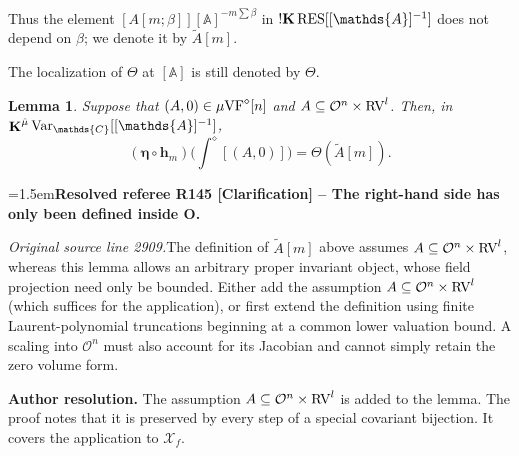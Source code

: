 \documentclass[12pt]{amsart}
\newcommand{\ResolvedRefereeRemark}[5]{%
  \par\medskip\begingroup\normalfont\small\color{gray}%
  \emergencystretch=1.5em\noindent\textbf{Resolved referee R#1 [#2] -- #3.}\par\nobreak\noindent #4\par
  \medskip\color{ResolutionGreen}\noindent\textbf{Author resolution.} #5\par
  \endgroup\medskip
}
\theoremstyle{plain}
\newtheorem{lem}[thm]{Lemma}
\theoremstyle{definition}
\theoremstyle{remark}
\numberwithin{equation}{section}
\theoremstyle{plain}
\newcommand{\VF}{\textup{VF}}
\newcommand{\RV}{\textup{RV}}
\newcommand{\OO}{\mdl O}
\newcommand{\A}{\mathds{A}}
\newcommand{\C}{\mathds{C}}
\newcommand{\0}{\emptyset}
\newcommand{\mdl}[1]{\mathcal{#1}}  %
\newcommand{\sub}{\subseteq}
\newcommand{\mgVF}{{\mu} {\VF}}
\newcommand{\RES}{\textup{RES}}
\DeclareMathOperator{\ggk}{\mathbf{K}}
\DeclareMathOperator{\sggk}{!\mathbf{K}}
\newcommand{\var}{\textup{Var}}
\newcommand{\gmv}{\ggk^{\hat \mu}\var_{\C}}
\begin{document}
Thus the element $[A[m;\beta]][\A]^{- m\sum \beta }$ in $\sggk \RES[[\A]^{-1}]$ does not depend on $\beta$; we denote it by $\tilde A[m]$.

The localization of $\Theta$ at $[\A]$ is still denoted by $\Theta$.

\begin{lem}\label{inv:dir:com}
Suppose that $(A, 0) \in \mgVF^\diamond[n]$ and $A \sub \OO^n \times \RV^l$. Then, in $\gmv[[\A]^{-1}]$,
\[
(\bm \eta \circ \bm h_m) \Big( \int^\diamond [(A, 0)] \Big) = \Theta(\tilde A[m]).
\]
\end{lem}

\ResolvedRefereeRemark{145}{Clarification}{The right-hand side has only been defined inside O}{%
\textit{Original source line 2909.}\quad The definition of $\tilde A[m]$ above assumes $A\subseteq\OO^n\times\RV^l$, whereas this lemma allows an arbitrary proper invariant object, whose field projection need only be bounded. Either add the assumption $A\subseteq\OO^n\times\RV^l$ (which suffices for the application), or first extend the definition using finite Laurent-polynomial truncations beginning at a common lower valuation bound. A scaling into $\OO^n$ must also account for its Jacobian and cannot simply retain the zero volume form.
}{The assumption $A\sub\OO^n\times\RV^l$ is added to the lemma. The proof notes that it is preserved by every step of a special covariant bijection. It covers the application to $\mdl X_f$.}
\end{document}
